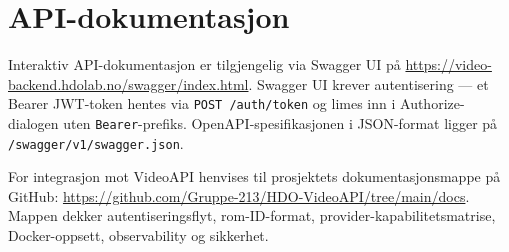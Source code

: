 \chapter{API-dokumentasjon}
\label{app:api-dokumentasjon}

Interaktiv API-dokumentasjon er tilgjengelig via Swagger UI på
\url{https://video-backend.hdolab.no/swagger/index.html}.
Swagger UI krever autentisering — et Bearer JWT-token hentes via
\texttt{POST /auth/token} og limes inn i Authorize-dialogen uten
\texttt{Bearer}-prefiks. OpenAPI-spesifikasjonen i JSON-format
ligger på \texttt{/swagger/v1/swagger.json}.

For integrasjon mot VideoAPI henvises til prosjektets
dokumentasjonsmappe på GitHub:
\url{https://github.com/Gruppe-213/HDO-VideoAPI/tree/main/docs}.
Mappen dekker autentiseringsflyt, rom-ID-format,
provider-kapabilitetsmatrise, Docker-oppsett, observability
og sikkerhet.